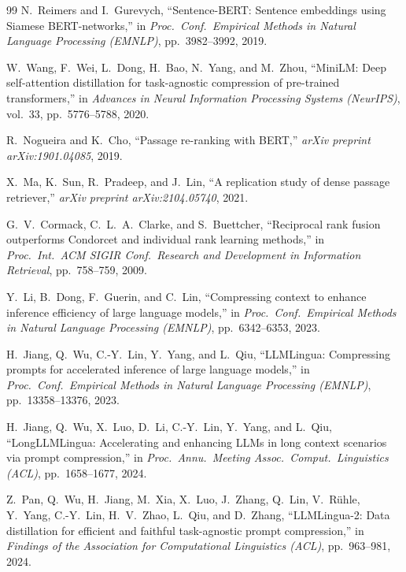 \documentclass[conference]{IEEEtran}
\begin{document}
\begin{thebibliography}{99}
N.~Reimers and I.~Gurevych, ``Sentence-BERT: Sentence embeddings using Siamese BERT-networks,'' in \emph{Proc.\ Conf.\ Empirical Methods in Natural Language Processing (EMNLP)}, pp.~3982--3992, 2019.

W.~Wang, F.~Wei, L.~Dong, H.~Bao, N.~Yang, and M.~Zhou, ``MiniLM: Deep self-attention distillation for task-agnostic compression of pre-trained transformers,'' in \emph{Advances in Neural Information Processing Systems (NeurIPS)}, vol.~33, pp.~5776--5788, 2020.

R.~Nogueira and K.~Cho, ``Passage re-ranking with BERT,'' \emph{arXiv preprint arXiv:1901.04085}, 2019.

X.~Ma, K.~Sun, R.~Pradeep, and J.~Lin, ``A replication study of dense passage retriever,'' \emph{arXiv preprint arXiv:2104.05740}, 2021.

G.~V.~Cormack, C.~L.~A.~Clarke, and S.~Buettcher, ``Reciprocal rank fusion outperforms Condorcet and individual rank learning methods,'' in \emph{Proc.\ Int.\ ACM SIGIR Conf.\ Research and Development in Information Retrieval}, pp.~758--759, 2009.

Y.~Li, B.~Dong, F.~Guerin, and C.~Lin, ``Compressing context to enhance inference efficiency of large language models,'' in \emph{Proc.\ Conf.\ Empirical Methods in Natural Language Processing (EMNLP)}, pp.~6342--6353, 2023.

H.~Jiang, Q.~Wu, C.-Y.~Lin, Y.~Yang, and L.~Qiu, ``LLMLingua: Compressing prompts for accelerated inference of large language models,'' in \emph{Proc.\ Conf.\ Empirical Methods in Natural Language Processing (EMNLP)}, pp.~13358--13376, 2023.

H.~Jiang, Q.~Wu, X.~Luo, D.~Li, C.-Y.~Lin, Y.~Yang, and L.~Qiu, ``LongLLMLingua: Accelerating and enhancing LLMs in long context scenarios via prompt compression,'' in \emph{Proc.\ Annu.\ Meeting Assoc.\ Comput.\ Linguistics (ACL)}, pp.~1658--1677, 2024.

Z.~Pan, Q.~Wu, H.~Jiang, M.~Xia, X.~Luo, J.~Zhang, Q.~Lin, V.~R\"{u}hle, Y.~Yang, C.-Y.~Lin, H.~V.~Zhao, L.~Qiu, and D.~Zhang, ``LLMLingua-2: Data distillation for efficient and faithful task-agnostic prompt compression,'' in \emph{Findings of the Association for Computational Linguistics (ACL)}, pp.~963--981, 2024.


\end{thebibliography}
\end{document}
